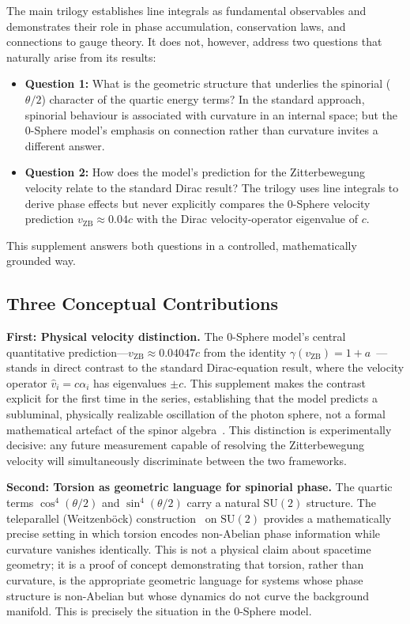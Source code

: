 \documentclass[12pt,letterpaper]{article}
\begin{document}
The main trilogy establishes line integrals as fundamental observables and demonstrates their role in phase accumulation, conservation laws, and connections to gauge theory. It does not, however, address two questions that naturally arise from its results:
\begin{itemize}
\item \textbf{Question 1:} What is the geometric structure that underlies the spinorial ($\theta/2$) character of the quartic energy terms? In the standard approach, spinorial behaviour is associated with curvature in an internal space; but the 0-Sphere model's emphasis on connection rather than curvature invites a different answer.
\item \textbf{Question 2:} How does the model's prediction for the Zitterbewegung velocity relate to the standard Dirac result? The trilogy uses line integrals to derive phase effects but never explicitly compares the 0-Sphere velocity prediction $v_{\mathrm{ZB}} \approx 0.04c$ with the Dirac velocity-operator eigenvalue of $c$.
\end{itemize}
This supplement answers both questions in a controlled, mathematically grounded way.

\subsection{Three Conceptual Contributions}

\textbf{First: Physical velocity distinction.} The 0-Sphere model's central quantitative prediction---$v_{\mathrm{ZB}} \approx 0.04047c$ from the identity $\gamma(v_{\mathrm{ZB}}) = 1 + a$~\cite{hanamura17765409}---stands in direct contrast to the standard Dirac-equation result, where the velocity operator $\hat{v}_i = c\alpha_i$ has eigenvalues $\pm c$. This supplement makes the contrast explicit for the first time in the series, establishing that the model predicts a subluminal, physically realizable oscillation of the photon sphere, not a formal mathematical artefact of the spinor algebra~\cite{hanamura17760132,hanamura18356895}. This distinction is experimentally decisive: any future measurement capable of resolving the Zitterbewegung velocity will simultaneously discriminate between the two frameworks.

\textbf{Second: Torsion as geometric language for spinorial phase.} The quartic terms $\cos^4(\theta/2)$ and $\sin^4(\theta/2)$ carry a natural $\mathrm{SU}(2)$ structure. The teleparallel (Weitzenb\"{o}ck) construction~\cite{Weitzenbock1923,Aldrovandi2013} on $\mathrm{SU}(2)$ provides a mathematically precise setting in which torsion encodes non-Abelian phase information while curvature vanishes identically. This is not a physical claim about spacetime geometry; it is a proof of concept demonstrating that torsion, rather than curvature, is the appropriate geometric language for systems whose phase structure is non-Abelian but whose dynamics do not curve the background manifold. This is precisely the situation in the 0-Sphere model.
\end{document}
